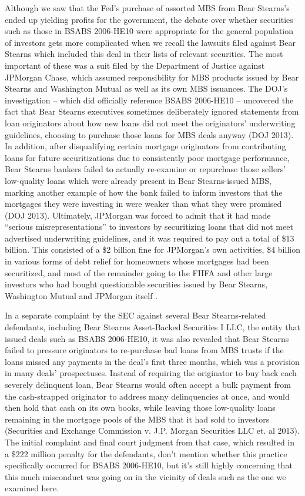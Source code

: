 \documentclass[12pt]{article}
\begin{document}
Although we saw that the Fed’s purchase of assorted MBS from Bear Stearns’s ended up yielding profits for the government, the debate over whether securities such as those in BSABS 2006-HE10 were appropriate for the general population of investors gets more complicated when we recall the lawsuits filed against Bear Stearns which included this deal in their lists of relevant securities. The most important of these was a suit filed by the Department of Justice against JPMorgan Chase, which assumed responsibility for MBS products issued by Bear Stearns and Washington Mutual as well as its own MBS issuances. The DOJ’s investigation – which did officially reference BSABS 2006-HE10 – uncovered the fact that Bear Stearns executives sometimes deliberately ignored statements from loan originators about how new loans did not meet the originators’ underwriting guidelines, choosing to purchase those loans for MBS deals anyway (DOJ 2013). In addition, after disqualifying certain mortgage originators from contributing loans for future securitizations due to consistently poor mortgage performance, Bear Stearns bankers failed to actually re-examine or repurchase those sellers’ low-quality loans which were already present in Bear Stearns-issued MBS, marking another example of how the bank failed to inform investors that the mortgages they were investing in were weaker than what they were promised (DOJ 2013). Ultimately, JPMorgan was forced to admit that it had made “serious misrepresentations” to investors by securitizing loans that did not meet advertised underwriting guidelines, and it was required to pay out a total of \$13 billion. This consisted of a \$2 billion fine for JPMorgan’s own activities, \$4 billion in various forms of debt relief for homeowners whose mortgages had been securitized, and most of the remainder going to the FHFA and other large investors who had bought questionable securities issued by Bear Stearns, Washington Mutual and JPMorgan itself \parencite{eavis13}. 

In a separate complaint by the SEC against several Bear Stearns-related defendants, including Bear Stearns Asset-Backed Securities I LLC, the entity that issued deals such as BSABS 2006-HE10, it was also revealed that Bear Stearns failed to pressure originators to re-purchase bad loans from MBS trusts if the loans missed any payments in the deal’s first three months, which was a provision in many deals’ prospectuses. Instead of requiring the originator to buy back each severely delinquent loan, Bear Stearns would often accept a bulk payment from the cash-strapped originator to address many delinquencies at once, and would then hold that cash on its own books, while leaving those low-quality loans remaining in the mortgage pools of the MBS that it had sold to investors (Securities and Exchange Commission v. J.P. Morgan Securities LLC et. al 2013). The initial complaint and final court judgment from that case, which resulted in a \$222 million penalty for the defendants, don’t mention whether this practice specifically occurred for BSABS 2006-HE10, but it’s still highly concerning that this much misconduct was going on in the vicinity of deals such as the one we examined here.
\end{document}
